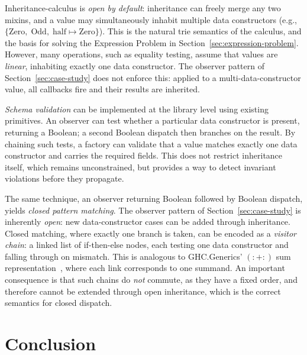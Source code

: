Inheritance-calculus is \emph{open by default}: inheritance
can freely merge any two mixins, and a value may simultaneously
inhabit multiple data constructors (e.g.,
$\{\mathrm{Zero},\; \mathrm{Odd},\; \mathrm{half} \mapsto \mathrm{Zero}\}$).
This is the natural trie semantics of the
calculus, and the basis for solving the Expression Problem
in Section~\ref{sec:expression-problem}.
However, many operations, such as equality testing, assume that values
are \emph{linear}, inhabiting exactly one data constructor.
The observer pattern of Section~\ref{sec:case-study} does not enforce
this: applied to a multi-data-constructor value, all callbacks fire and
their results are inherited.

\emph{Schema validation} can be implemented at the library level
using existing primitives.
An observer can test whether a particular data constructor is present,
returning a Boolean; a second Boolean dispatch then branches on the
result.
By chaining such tests, a factory can validate that a value matches
exactly one data constructor and carries the required fields.
This does not restrict inheritance itself, which remains
unconstrained, but provides a way to detect invariant violations
before they propagate.

The same technique, an observer returning Boolean followed by Boolean
dispatch, yields \emph{closed pattern matching}.
The observer pattern of Section~\ref{sec:case-study} is inherently
\emph{open}: new data-constructor cases can be added through inheritance.
Closed matching, where exactly one branch is taken, can be encoded as
a \emph{visitor chain}: a linked list of if-then-else nodes, each
testing one data constructor and falling through on mismatch.
This is analogous to GHC.Generics' $\mathrm{(:+:)}$ sum
representation~\cite{magalhaes2010-generic-deriving}, where each link
corresponds to one summand.
An important consequence is that such chains do \emph{not}
commute, as they have a fixed order, and therefore cannot be extended
through open inheritance, which is the correct semantics for closed
dispatch.

\section{Conclusion}

